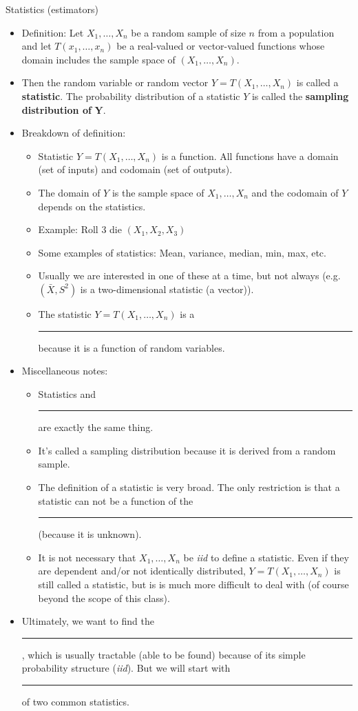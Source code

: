 \documentclass{article}
\newcommand{\blankul}[1]{\rule[-1.5mm]{#1}{0.15mm}}	%
\newcommand{\vecn}[2]{#1_1, \ldots, #1_{#2}}	%
\begin{document}
Statistics (estimators)\bigskip
\begin{itemize}
    \item Definition: Let $\vecn{X}{n}$ be a random sample of size $n$ from a population and let $T(\vecn{x}{n})$ be a real-valued or vector-valued functions whose domain includes the sample space of $(X_1, \dots, X_n)$.
    \item[] Then the random variable or random vector $Y = T(\vecn{X}{n})$ is called a \textbf{statistic}. The probability distribution of a statistic $Y$ is called the \textbf{sampling distribution of} $\boldsymbol{Y}$.\bigskip
    \item Breakdown of definition:
    \begin{itemize}
        \item Statistic $Y= T(\vecn{X}{n})$ is a function. All functions have a domain (set of inputs) and codomain (set of outputs).
        \item[] The domain of $Y$ is the sample space of $\vecn{X}{n}$ and the codomain of $Y$ depends on the statistics.
        \item Example: Roll 3 die $(X_1, X_2, X_3)$\vspace{50pt}
        \item[] Some examples of statistics: Mean, variance, median, min, max, etc.
        \item[] Usually we are interested in one of these at a time, but not always (e.g. $(\bar{X}, S^2 )$ is a two-dimensional statistic (a vector)).
        \item The statistic $Y = T(\vecn{X}{n})$ is a \blankul{4cm} because it is a function of random variables.
    \end{itemize}\bigskip
    \item Miscellaneous notes:
    \begin{itemize}
        \item Statistics and \blankul{3cm} are exactly the same thing.
        \item It's called a sampling distribution because it is derived from a random sample.
	\item The definition of a statistic is very broad. The only restriction is that a statistic can not be a function of the \blankul{3cm} (because it is unknown).
	\item It is not necessary that $\vecn{X}{n}$ be \textit{iid} to define a statistic. Even if they are dependent and/or not identically distributed, $Y = T(\vecn{X}{n})$ is still called a statistic, but is is much more difficult to deal with (of course beyond the scope of this class).
    \end{itemize}\bigskip
        \item Ultimately, we want to find the \blankul{3cm}, which is usually tractable (able to be found) because of its simple probability structure (\textit{iid}). But we will start with \blankul{4cm} of two common statistics.
\end{itemize}\bigskip
\end{document}
